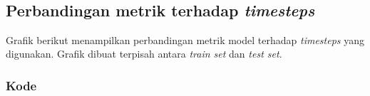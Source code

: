 \documentclass[11pt]{article}
\begin{document}
    \begin{center}
    \end{center}
    { \hspace*{\fill} \\}
    
    \hypertarget{perbandingan-metrik-terhadap-timesteps}{%
\subsection{\texorpdfstring{Perbandingan metrik terhadap
\emph{timesteps}}{Perbandingan metrik terhadap timesteps}}\label{perbandingan-metrik-terhadap-timesteps}}

Grafik berikut menampilkan perbandingan metrik model terhadap
\emph{timesteps} yang digunakan. Grafik dibuat terpisah antara
\emph{train set} dan \emph{test set}.

    \hypertarget{kode}{%
\subsubsection{Kode}\label{kode}}
\end{document}
